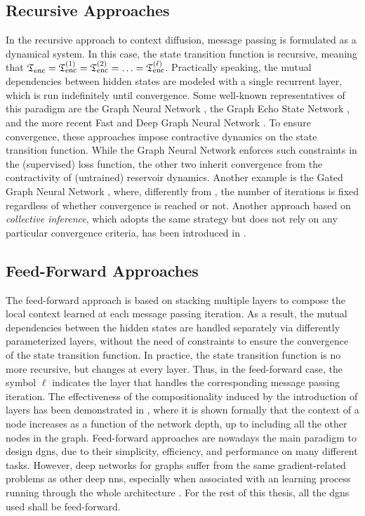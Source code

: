 \subsection{Recursive Approaches}
In the recursive approach to context diffusion, message passing is formulated as a dynamical system. In this case, the state transition function is recursive, meaning that $\mathfrak{T}_{\mathrm{enc}} = \mathfrak{T}_{\mathrm{enc}}^{(1)} = \mathfrak{T}_{\mathrm{enc}}^{(2)} = \ldots = \mathfrak{T}_{\mathrm{enc}}^{(\ell)}$. Practically speaking, the mutual dependencies between hidden states are modeled with a single recurrent layer, which is run indefinitely until convergence. Some well-known representatives of this paradigm are the Graph Neural Network \citep{scarselli2009gnn}, the Graph Echo State Network \citep{gallicchio2010graphesn}, and the more recent Fast and Deep Graph Neural Network \citep{gallicchio2020fastdeepgnn}. To ensure convergence, these approaches impose contractive dynamics on the state transition function. While the Graph Neural Network enforces such constraints in the (supervised) loss function, the other two inherit convergence from the contractivity of (untrained) reservoir dynamics. Another example is the Gated Graph Neural Network \citep{li2016gatedgnn}, where, differently from \citep{scarselli2009gnn}, the number of iterations is fixed \apriori regardless of whether convergence is reached or not. Another approach based on \emph{collective inference}, which adopts the same strategy but does not rely on any particular convergence criteria, has been introduced in \citep{macskassy2007classificationnetworkdata}.

\subsection{Feed-Forward Approaches}
The feed-forward approach is based on stacking multiple layers to compose the local context learned at each message passing iteration. As a result, the mutual dependencies between the hidden states are handled separately via differently parameterized layers, without the need of constraints to ensure the convergence of the state transition function. In practice, the state transition function is no more recursive, but changes at every layer. Thus, in the feed-forward case, the symbol $\ell$ indicates the layer that handles the corresponding message passing iteration. The effectiveness of the compositionality induced by the introduction of layers has been demonstrated in \citep{micheli2009nn4g}, where it is shown formally that the context of a node increases as a function of the network depth, up to including all the other nodes in the graph. Feed-forward approaches are nowadays the main paradigm to design \glspl{dgn}, due to their simplicity, efficiency, and performance on many different tasks. However, deep networks for graphs suffer from the same gradient-related problems as other deep \glspl{nn}, especially when associated with an  learning process running through the whole architecture \citep{bengio1994learninglongtermdependenciesdifficult,li2018deeperinsightgraphconvsemisupervised}. For the rest of this thesis, all the \glspl{dgn} used shall be feed-forward.

